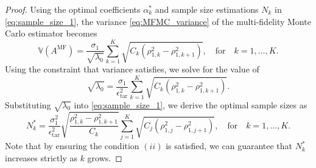 \begin{proof}
Using the optimal coefficients $\alpha_k^*$ and sample size estimations $N_k$ in \eqref{eq:sample_size_1}, the variance \eqref{eq:MFMC_variance} of the multi-fidelity Monte Carlo estimator becomes
%
\begin{equation*} \label{eq:MFMC_variance2}
    \mathbb{V}\left(A^{\text{MF}}\right) = \frac{\sigma_1}{\sqrt{\lambda_0}}\sum_{k=1}^K\sqrt{C_k\left(\rho_{1,k}^2-\rho_{1,k+1}^2\right)}, \quad \text{for}\quad  k=1,\ldots,K.
\end{equation*}
%
Using the constraint that variance satisfies, we solve for the value of 
%
\[
\sqrt{\lambda_0} = \frac{\sigma_1}{\epsilon_{\text{tar}}^2}\sum_{k=1}^K\sqrt{C_k\left(\rho_{1,k}^2-\rho_{1,k+1}^2\right)}.
\]
%
Substituting $\sqrt{\lambda_0}$ into \eqref{eq:sample_size_1}, we derive the optimal sample sizes as
%
\[
N_k^* = \frac{\sigma_1^2}{\epsilon_{\text{tar}}^2}\sqrt{\frac{\rho_{1,k}^2-\rho_{1,k+1}^2}{C_k}}\sum_{j=1}^K\sqrt{C_j\left(\rho_{1,j}^2-\rho_{1,j+1}^2\right)},\quad \text{for}\quad  k=1,\ldots,K.
\]
%
Note that by ensuring the condition $(ii)$ is satisfied, we can guarantee that $N_k^*$ increases strictly as $k$ grows. 
\end{proof}
%

